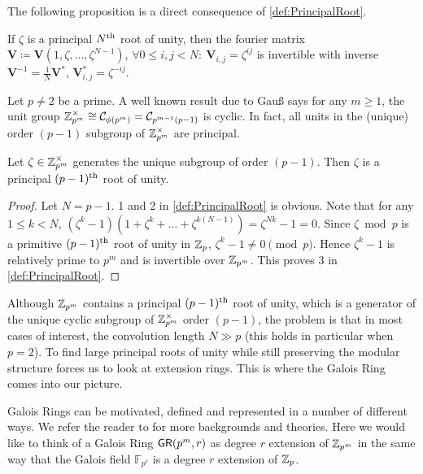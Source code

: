 The following proposition is a direct consequence of \cref{def:PrincipalRoot}.
\begin{proposition} \label{prop:InvFourierMat}
    If \(\zeta\) is a principal \(N\textsuperscript{th}\) root of unity, then the fourier matrix \(\bm{V} \coloneq \bm{V}(1, \zeta, \ldots, \zeta^{N-1})\), \(\forall 0 \le i,j < N:\:\bm{V}_{i,j} = \zeta^{ij}\) is invertible with inverse \(\bm{V}^{-1} = \frac{1}{N}\bm{V}^{\ast}\), \(\bm{V}^{\ast}_{i,j} = \zeta^{-ij}\).
\end{proposition}

\ifFullVersion
Let \(p \ne 2\) be a prime. A well known result due to Gau{\ss} says for any \(m \ge 1\), the unit group \(\mathbb{Z}_{p^m}^{\times} \cong \mathcal{C}_{\phi(p^m)} = \mathcal{C}_{p^{m-1}(p-1)}\) is cyclic. In fact, all units in the (unique) order \((p-1)\) subgroup of \(\mathbb{Z}_{p^m}^{\times}\) are principal.
\begin{proposition} \label{prop:SubgrpPrincipal}
    Let \(\zeta \in \mathbb{Z}_{p^m}^{\times}\) generates the unique subgroup of order \((p - 1)\). Then \(\zeta\) is a principal \((p-1)\textsuperscript{th}\) root of unity.
\end{proposition}
\begin{proof}
    Let \(N = p - 1\). 1 and 2 in \cref{def:PrincipalRoot} is obvious. Note that for any \(1 \le k < N\), \((\zeta^k - 1)(1 + \zeta^k + \ldots + \zeta^{k(N-1)}) = \zeta^{Nk} - 1 = 0\). Since \(\zeta \bmod p\) is a primitive \((p-1)\textsuperscript{th}\) root of unity in \(\mathbb{Z}_p\), \(\zeta^k - 1 \ne 0 \pmod{p}\). Hence \(\zeta^k - 1\) is relatively prime to \(p^m\) and is invertible over \(\mathbb{Z}_{p^m}\). This proves 3 in \cref{def:PrincipalRoot}.
\end{proof}
\fi

Although \(\mathbb{Z}_{p^m}\) contains a principal \((p-1)\textsuperscript{th}\) root of unity, which is a generator of the unique cyclic subgroup of \(\mathbb{Z}_{p^m}^{\times}\) order \((p - 1)\), the problem is that in most cases of interest, the convolution length \(N \gg p\) (this holds in particular when \(p = 2\)). To find large principal roots of unity while still preserving the modular structure forces us to look at extension rings. This is where the Galois Ring comes into our picture.

Galois Rings can be motivated, defined and represented in a number of different ways. We refer the reader to  for more backgrounds and theories. Here we would like to think of a Galois Ring \(\mathsf{GR}(p^m, r)\) as degree \(r\) extension of \(\mathbb{Z}_{p^m}\) in the same way that the Galois field \(\mathbb{F}_{p^r}\) is a degree \(r\) extension of \(\mathbb{Z}_p\).

